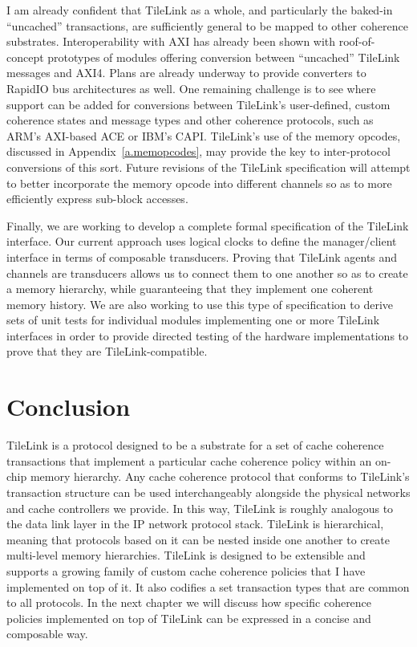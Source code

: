 I am already confident that TileLink as a whole, and particularly the baked-in ``uncached'' transactions,
are sufficiently general to be mapped to other coherence substrates.
Interoperability with AXI has already been shown with roof-of-concept prototypes of modules offering conversion between ``uncached'' TileLink messages and AXI4.
Plans are already underway to provide converters to RapidIO bus architectures as well.
One remaining challenge is to see where support can be added for conversions between TileLink's user-defined, custom coherence states and message types and other coherence protocols,
such as ARM's AXI-based ACE or IBM's CAPI.
TileLink's use of the memory opcodes, discussed in Appendix~\ref{a.memopcodes}, may provide the key to inter-protocol conversions of this sort.
Future revisions of the TileLink specification will attempt to better incorporate the memory opcode into different channels so as to more efficiently express sub-block accesses.

Finally, we are working to develop a complete formal specification of the TileLink interface.
Our current approach uses logical clocks to define the manager/client interface in terms of composable transducers.
Proving that TileLink agents and channels are transducers allows us to connect them to one another so as to create a memory hierarchy,
while guaranteeing that they implement one coherent memory history.
We are also working to use this type of specification to derive sets of unit tests for individual modules implementing one or more TileLink interfaces
in order to provide directed testing of the hardware implementations to prove that they are TileLink-compatible.

\section{Conclusion}

TileLink is a protocol designed to be a substrate for a set of cache coherence transactions
that implement a particular cache coherence policy within an on-chip memory hierarchy.
Any cache coherence protocol that conforms to TileLink's transaction structure can be used interchangeably alongside the physical networks and cache controllers we provide.
In this way, TileLink is roughly analogous to the data link layer in the IP network protocol stack.
TileLink is hierarchical, meaning that protocols based on it can be nested inside one another to create multi-level memory hierarchies.
TileLink is designed to be extensible and supports a growing family of custom cache coherence policies that I have implemented on top of it.
It also codifies a set transaction types that are common to all protocols.
In the next chapter we will discuss how specific coherence policies implemented on top of TileLink can be expressed in a concise and composable way.

